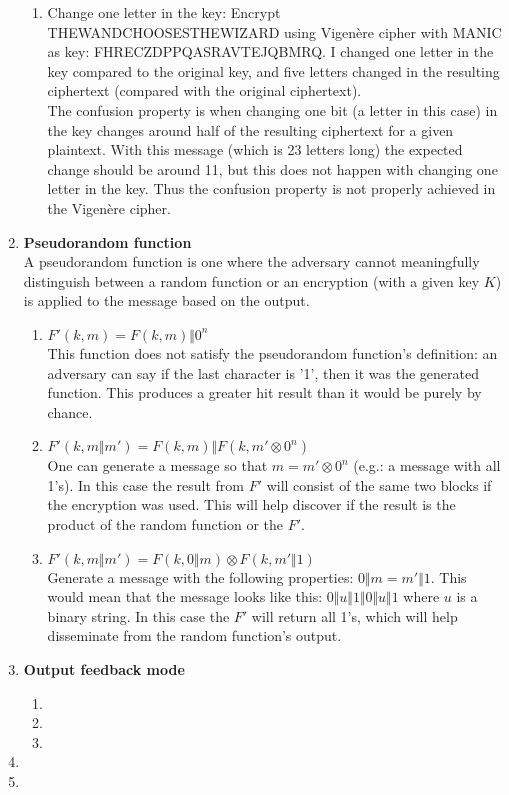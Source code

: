 \documentclass{article}
\begin{document}
\begin{enumerate}[label=\textbf{Task \arabic*:}]
\begin{enumerate}[label=\textit{Part \roman*:}]
			\item Change one letter in the key: Encrypt \textsc{THEWANDCHOOSESTHEWIZARD} using Vigenère cipher with \textsc{MANIC} as key: \textsc{FHRECZDPPQASRAVTEJQBMRQ}. I changed one letter in the key compared to the original key, and five letters changed in the resulting ciphertext (compared with the original ciphertext).\\
			The confusion property is when changing one bit (a letter in this case) in the key changes around half of the resulting ciphertext for a given plaintext. With this message (which is 23 letters long) the expected change should be around 11, but this does not happen with changing one letter in the key. Thus the confusion property is not properly achieved in the Vigenère cipher.	
		\end{enumerate}
		\item \textbf{Pseudorandom function} \\
		A pseudorandom function is one where the adversary cannot meaningfully distinguish between a random function or an encryption (with a given key $K$) is applied to the message based on the output.
		\begin{enumerate}[label=-]
			\item $ F'(k, m) = F(k, m) \Vert 0^n $ \\
			This function does not satisfy the pseudorandom function's definition: an adversary can say if the last character is '1', then it was the generated function. This produces a greater hit result than it would be purely by chance.
			\item $ F'(k, m \Vert m') = F(k, m) \Vert F(k, m' \otimes 0^n) $ \\
			One can generate a message so that $m = m' \otimes 0^n$ (e.g.: a message with all 1's). In this case the result from $F'$ will consist of the same two blocks if the encryption was used. This will help discover if the result is the product of the random function or the $F'$.
			\item $ F'(k, m \Vert m') = F(k, 0 \Vert m) \otimes F(k, m' \Vert 1) $\\
			Generate a message with the following properties: $ 0 \Vert m = m' \Vert 1 $. This would mean that the message looks like this: $ 0 \Vert u \Vert 1 \Vert 0 \Vert u \Vert 1 $ where $u$ is a binary string. In this case the $F'$ will return all 1's, which will help disseminate from the random function's output.
		\end{enumerate}
		\item \textbf{Output feedback mode}\\
		\begin{enumerate}[label=\textit{Part \roman*:}]
			\item 
			\item 
			\item 
		\end{enumerate}
		
		\item  %
		
		\item  %
		
	\end{enumerate}
	
\end{document}
